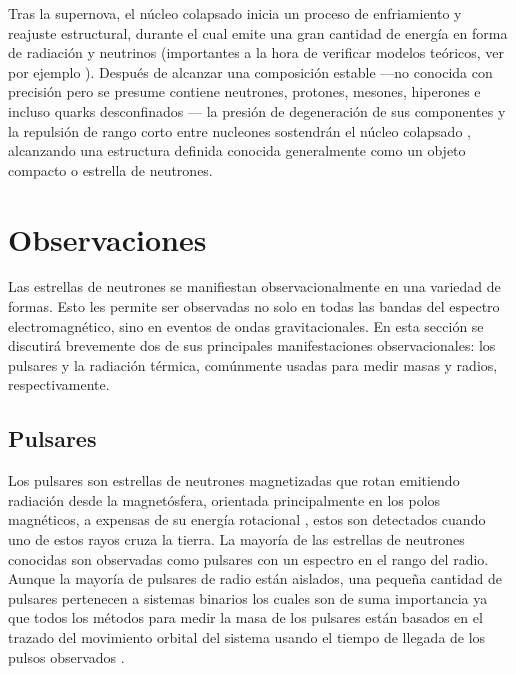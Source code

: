 Tras la supernova, el núcleo colapsado   inicia un proceso de enfriamiento y reajuste estructural, durante el cual emite una gran cantidad de energía en forma de radiación y neutrinos (importantes a la hora de verificar modelos teóricos, ver por ejemplo \cite{Alvarez-Salazar2018}). Después de alcanzar una composición estable —no conocida con precisión pero se presume contiene neutrones, protones, mesones, hiperones e incluso quarks desconfinados \cite{Lattimer2004}— la presión de degeneración de sus componentes y la repulsión de rango corto entre nucleones sostendrán el núcleo colapsado \cite{Glendenning2000}, alcanzando una estructura definida conocida generalmente como un objeto compacto o estrella de neutrones.
\section{Observaciones}\label{ObsMan}
\noindent Las estrellas de neutrones se manifiestan observacionalmente en una variedad de formas. Esto les permite ser observadas no solo en todas las bandas del espectro electromagnético, sino en eventos de ondas gravitacionales. En esta sección se discutirá brevemente dos de sus principales manifestaciones observacionales: los pulsares y la radiación térmica, comúnmente usadas para medir masas y radios, respectivamente.

\subsection{Pulsares}

\noindent Los pulsares son estrellas de neutrones magnetizadas que rotan emitiendo radiación desde la magnetósfera, orientada principalmente en los polos magnéticos, a expensas de su energía rotacional \cite{Becker2009}, estos son detectados cuando uno de estos rayos cruza la tierra. La mayoría de las estrellas de neutrones conocidas son observadas como pulsares con un espectro en el rango del radio. Aunque la mayoría de pulsares de radio están aislados, una pequeña cantidad de pulsares pertenecen a sistemas binarios los cuales son de suma importancia ya que todos los métodos para medir la masa de los pulsares están basados en el trazado del movimiento orbital del sistema usando el tiempo de llegada de los pulsos observados \cite{Ozel2016}.


